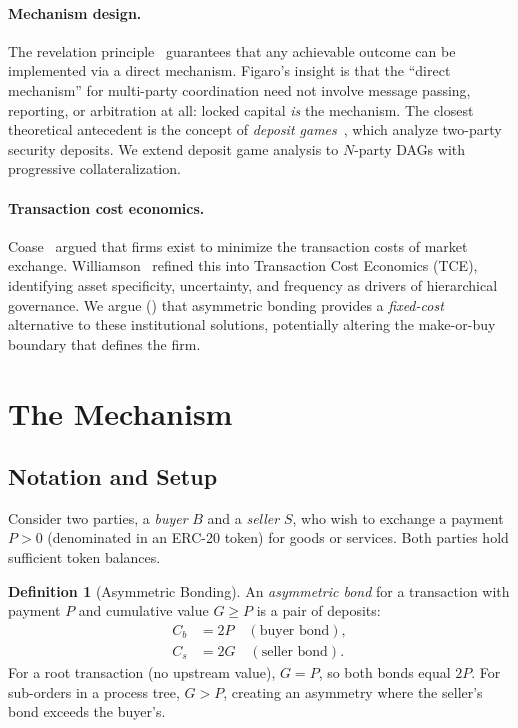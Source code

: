 \documentclass[11pt,a4paper]{article}
\theoremstyle{definition}
\newtheorem{definition}[theorem]{Definition}
\theoremstyle{remark}
\newcommand{\pay}{P}           %
\newcommand{\cumval}{G}        %
\newcommand{\sbond}{C_s}       %
\newcommand{\bbond}{C_b}       %
\begin{document}
\paragraph{Mechanism design.}
The revelation principle~\citep{myerson1981} guarantees that any
achievable outcome can be implemented via a direct mechanism. Figaro's
insight is that the ``direct mechanism'' for multi-party coordination
need not involve message passing, reporting, or arbitration at all:
locked capital \emph{is} the mechanism. The closest theoretical
antecedent is the concept of \emph{deposit
games}~\citep{asgaonkar2019}, which analyze two-party security deposits.
We extend deposit game analysis to $N$-party DAGs with progressive
collateralization.

\paragraph{Transaction cost economics.}
Coase~\citep{coase1937} argued that firms exist to minimize the
transaction costs of market exchange. Williamson~\citep{williamson1985}
refined this into Transaction Cost Economics (TCE), identifying asset
specificity, uncertainty, and frequency as drivers of hierarchical
governance. We argue () that asymmetric bonding
provides a \emph{fixed-cost} alternative to these institutional
solutions, potentially altering the make-or-buy boundary that defines
the firm.

\section{The Mechanism}
\label{sec:mechanism}

\subsection{Notation and Setup}

Consider two parties, a \emph{buyer} $B$ and a \emph{seller} $S$, who
wish to exchange a payment $\pay > 0$ (denominated in an ERC-20 token)
for goods or services. Both parties hold sufficient token balances.

\begin{definition}[Asymmetric Bonding]
\label{def:asymmetric-bonding}
An \emph{asymmetric bond} for a transaction with payment $\pay$ and
cumulative value $\cumval \geq \pay$ is a pair of deposits:
\begin{align}
  \bbond &= 2\pay \quad (\text{buyer bond}), \label{eq:buyer-bond} \\
  \sbond &= 2\cumval \quad (\text{seller bond}). \label{eq:seller-bond}
\end{align}
For a root transaction (no upstream value), $\cumval = \pay$, so both
bonds equal $2\pay$. For sub-orders in a process tree,
$\cumval > \pay$, creating an asymmetry where the seller's bond exceeds
the buyer's.
\end{definition}
\end{document}
